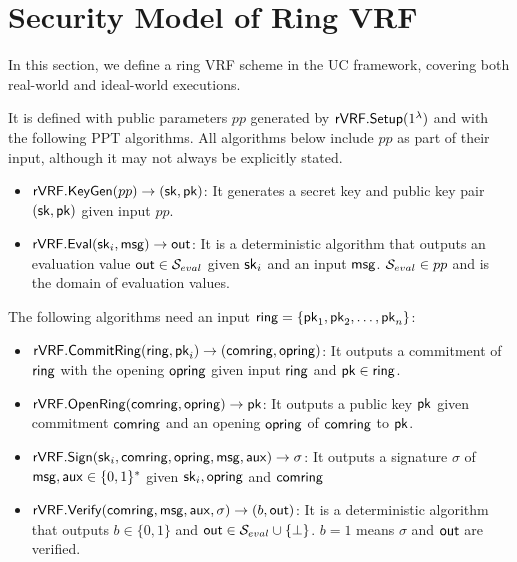 


\section{Security Model  of Ring VRF}
In this section, we define a ring VRF scheme in the UC framework, covering both real-world and ideal-world executions.

\begin{definition} \label{def:ringVRF}	It  is defined with public parameters $ pp $ generated by  $ {\mathsf{rVRF}}.{\mathsf{Setup}}(1^\lambda) $ and with the following  PPT algorithms. All algorithms below include $ pp $ as part of their input, although it may not always be explicitly stated.
	\begin{itemize}
		\item $ {\mathsf{rVRF}}.{\mathsf{KeyGen}}(pp) \rightarrow (\mathsf{sk},\mathsf{pk})$: It generates a secret key and public key pair $ (\mathsf{sk},\mathsf{pk}) $ given input $ pp $.
		\item $ {\mathsf{rVRF}}.{\mathsf{Eval}}(\mathsf{sk}_i, \mathsf{msg}) \rightarrow {\ensuremath{\mathsf{out}}}$: It is a deterministic algorithm that outputs an evaluation value $ {\mathsf{out}} \in {\ensuremath{\mathcal{S}}}_{eval}$ given  $ \mathsf{sk}_i $ and an input $ \mathsf{msg} $. $ {\mathcal{S}}_{eval} \in pp$ and is the domain  of  evaluation values.
	\end{itemize}
	The following algorithms need an input $ \mathsf{ring} = \{ \mathsf{pk}_1, \mathsf{pk}_2, \ldots, \mathsf{pk}_n \}$:
	\begin{itemize}
		\item $ {\mathsf{rVRF}}.{\mathsf{CommitRing}}(\mathsf{ring}, \mathsf{pk}_i)  \rightarrow (\mathsf{comring}, \mathsf{opring})$: It  outputs a commitment of $ \mathsf{ring} $ with the opening $ \mathsf{opring} $ given input  $ \mathsf{ring} $ and $ \mathsf{pk} \in \mathsf{ring} $.
		\item $ {\mathsf{rVRF}}.{\mathsf{OpenRing}}(\mathsf{comring},\mathsf{opring}) \rightarrow \mathsf{pk} $: It  outputs a public key $ \mathsf{pk}  $ given commitment $ \mathsf{comring} $ and an opening $ \mathsf{opring} $ of $\mathsf{comring}$ to $\mathsf{pk}$.
		\item $ {\mathsf{rVRF}}.{\mathsf{Sign}}(\mathsf{sk}_i, \mathsf{comring},\mathsf{opring}, \mathsf{msg}, \mathsf{aux})\rightarrow \sigma$: It  outputs a  signature  $\sigma $  of  $ \mathsf{msg}, \mathsf{aux} \in \{0,1\}^*$ given $ \mathsf{sk}_i, \mathsf{opring} $  and $ \mathsf{comring} $ 
		\item $ {\mathsf{rVRF}}.{\mathsf{Verify}}(\mathsf{comring},\mathsf{msg},\mathsf{aux},\sigma) \rightarrow  (b, {\mathsf{out}})$: It is a deterministic  algorithm that outputs  $ b \in \{0,1\} $ and $ {\mathsf{out}} \in{\ensuremath{\mathcal{S}}}_{eval}\cup \{\perp\} $. $ b =1 $ means $ \sigma $ and $ {\mathsf{out}} $ are verified.
	\end{itemize}
	
\end{definition}


